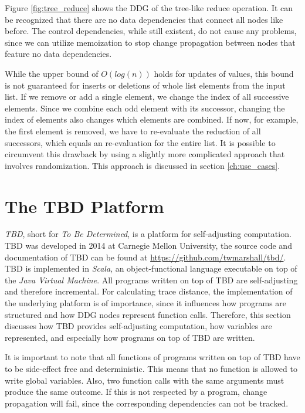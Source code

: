 Figure \ref{fig:tree_reduce} shows the DDG of the tree-like reduce operation. It can be recognized that there are no data dependencies that connect all nodes like before. The control dependencies, while still existent, do not cause any problems, since we can utilize memoization to stop change propagation between nodes that feature no data dependencies. 

While the upper bound of $O(log(n))$ holds for updates of values, this bound is not guaranteed for inserts or deletions of whole list elements from the input list. If we remove or add a single element, we change the index of all successive elements. Since we combine each odd element with its successor, changing the index of elements also changes which elements are combined. If now, for example, the first element is removed, we have to re-evaluate the reduction of all successors, which equals an re-evaluation for the entire list. 
It is possible to circumvent this drawback by using a slightly more complicated approach that involves randomization. This approach is discussed in section \ref{ch:use_cases}. 

\chapter{The TBD Platform}
\label{ch:tbd_platform}

\textit{TBD}, short for \textit{To Be Determined}, is a platform for self-adjusting computation. TBD was developed in 2014 at Carnegie Mellon University, the source code and documentation of TBD can be found at \url{https://github.com/twmarshall/tbd/}. TBD is implemented in \textit{Scala}, an object-functional language executable on top of the \textit{Java Virtual Machine}. All programs written on top of TBD are self-adjusting and therefore incremental. For calculating trace distance, the implementation of the underlying platform is of importance, since it influences how programs are structured and how DDG nodes represent function calls. Therefore, this section discusses how TBD provides self-adjusting computation, how variables are represented, and especially how programs on top of TBD are written. 

It is important to note that all functions of programs written on top of TBD have to be side-effect free and deterministic. This means that no function is allowed to write global variables. Also, two function calls with the same arguments must produce the same outcome. If this is not respected by a program, change propagation will fail, since the corresponding dependencies can not be tracked. 

